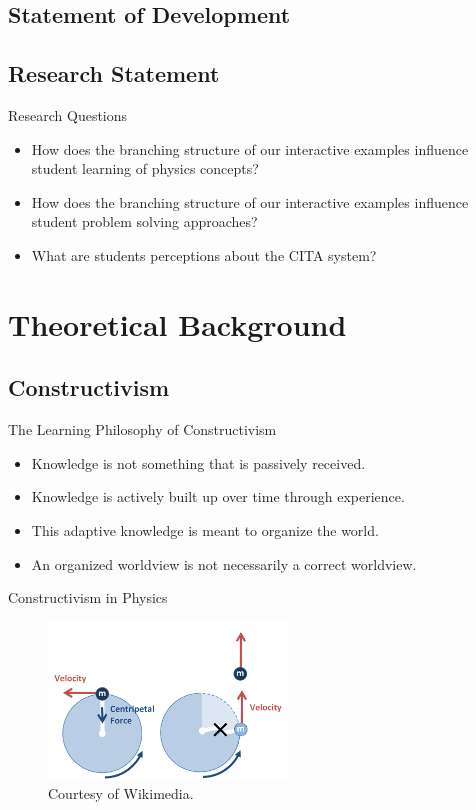\documentclass{beamer}
\begin{document}
\subsection*{Statement of Development}

\subsection*{Research Statement}

\begin{frame}{Research Questions}
  \begin{itemize}
  \item How does the branching structure of our interactive examples influence student learning of physics concepts?
  \item How does the branching structure of our interactive examples influence student problem solving approaches?
  \item What are students perceptions about the CITA system?
  \end{itemize}
\end{frame}

\section{Theoretical Background}

\subsection*{Constructivism}

\begin{frame}{The Learning Philosophy of Constructivism}
\begin{itemize}
\item Knowledge is not something that is passively received.
\item Knowledge is actively built up over time through experience.
\item This adaptive knowledge is meant to organize the world.
\item An organized worldview is not necessarily a correct worldview.
\end{itemize}
\end{frame}

\begin{frame}{Constructivism in Physics}
  \begin{figure}
  \centering
    \includegraphics[width=2.5in]{img/presentation/ucm_string}
    \caption{Courtesy of Wikimedia.}
  \end{figure}
\end{frame}
\end{document}
